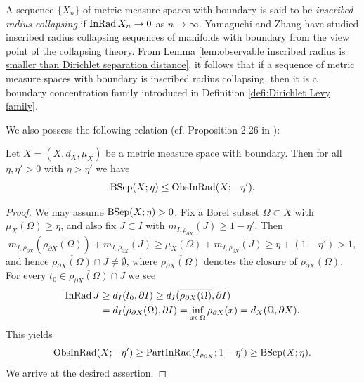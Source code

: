 \begin{rem}
A sequence $\{X_{n}\}$ of metric measure spaces with boundary is said to be \textit{inscribed radius collapsing} if 
$\operatorname{InRad} X_{n} \to 0$ as $n\to \infty$.
Yamaguchi and Zhang \cite{YZ} have studied inscribed radius collapsing sequences of manifolds with boundary from the view point of the collapsing theory.
From Lemma \ref{lem:observable inscribed radius is smaller than Dirichlet separation distance},
it follows that
if a sequence of metric measure spaces with boundary is inscribed radius collapsing,
then it is a boundary concentration family introduced in Definition \ref{defi:Dirichlet Levy family}.
\end{rem}

We also possess the following relation (cf. Proposition 2.26 in \cite{Sh}):
\begin{lem}\label{lem:Dirichlet separation distance is smaller than observable inscribed radius}
Let $X=(X,d_{X},\mu_{X})$ be a metric measure space with boundary.
Then for all $\eta,\eta'>0$ with $\eta>\eta'$
we have
\begin{equation*}
\operatorname{BSep}(X;\eta) \leq \operatorname{ObsInRad}(X;-\eta').
\end{equation*}
\end{lem}
\begin{proof}
We may assume $\operatorname{BSep}(X;\eta)>0$.
Fix a Borel subset $\Omega \subset X$ with $\mu_{X}(\Omega)\geq \eta$,
and also fix $J \subset I$ with $m_{I,\rho_{\partial X}}(J) \geq 1-\eta'$.
Then
\begin{equation*}
m_{I,\rho_{\partial X}}(\overline{\rho_{\partial X}(\Omega)})+m_{I,\rho_{\partial X}}(J)\geq \mu_{X}(\Omega)+m_{I,\rho_{\partial X}}(J)\geq \eta+(1-\eta') >1,
\end{equation*}
and hence $\overline{\rho_{\partial X}(\Omega)} \cap J \neq \emptyset$,
where $\overline{\rho_{\partial X}(\Omega)}$ denotes the closure of $\rho_{\partial X}(\Omega)$.
For every $t_{0} \in \overline{\rho_{\partial X}(\Omega)} \cap J$
we see
\begin{align*}
\operatorname{InRad} J &\geq d_{I}(t_{0},\partial I) \geq d_{I}(\overline{\rho_{\partial X}(\Omega)},\partial I)\\
        &=d_{I}(\rho_{\partial X}(\Omega),\partial I)=\inf_{x\in \Omega} \rho_{\partial X}(x)=d_{X}(\Omega,\partial X).
\end{align*}
This yields
\begin{equation*}
\operatorname{ObsInRad}(X;-\eta') \geq \operatorname{PartInRad}(I_{\rho_{\partial X}};1-\eta')\geq \operatorname{BSep}(X;\eta).
\end{equation*}
We arrive at the desired assertion.
\end{proof}

